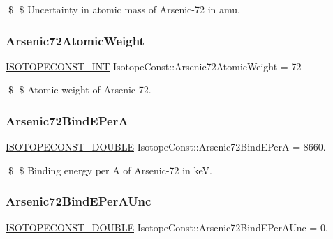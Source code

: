 \$ \$ Uncertainty in atomic mass of Arsenic-\/72 in amu. \mbox{\label{group___isotope_const-_arsenic-_as72_gac02fcf0f9451467f1d8d24dc8b43c2a9}} 
\subsubsection{\texorpdfstring{Arsenic72\+Atomic\+Weight}{Arsenic72AtomicWeight}}
{\footnotesize\ttfamily \mbox{\hyperlink{group___isotope_const-_macros_ga5f18360b3e99483a35c32d789e62621c}{I\+S\+O\+T\+O\+P\+E\+C\+O\+N\+S\+T\+\_\+\+I\+NT}} Isotope\+Const\+::\+Arsenic72\+Atomic\+Weight = 72}

\$ \$ Atomic weight of Arsenic-\/72. \mbox{\label{group___isotope_const-_arsenic-_as72_ga0e5c103658e5db168b47cb0705ba1d75}} 
\subsubsection{\texorpdfstring{Arsenic72\+Bind\+E\+PerA}{Arsenic72BindEPerA}}
{\footnotesize\ttfamily \mbox{\hyperlink{group___isotope_const-_macros_ga8f45a7272ce02c0b4c65c44636ed719a}{I\+S\+O\+T\+O\+P\+E\+C\+O\+N\+S\+T\+\_\+\+D\+O\+U\+B\+LE}} Isotope\+Const\+::\+Arsenic72\+Bind\+E\+PerA = 8660.}

\$ \$ Binding energy per A of Arsenic-\/72 in keV. \mbox{\label{group___isotope_const-_arsenic-_as72_ga8590584ad6dfa0a9163c935b7c14ebe1}} 
\subsubsection{\texorpdfstring{Arsenic72\+Bind\+E\+Per\+A\+Unc}{Arsenic72BindEPerAUnc}}
{\footnotesize\ttfamily \mbox{\hyperlink{group___isotope_const-_macros_ga8f45a7272ce02c0b4c65c44636ed719a}{I\+S\+O\+T\+O\+P\+E\+C\+O\+N\+S\+T\+\_\+\+D\+O\+U\+B\+LE}} Isotope\+Const\+::\+Arsenic72\+Bind\+E\+Per\+A\+Unc = 0.}

